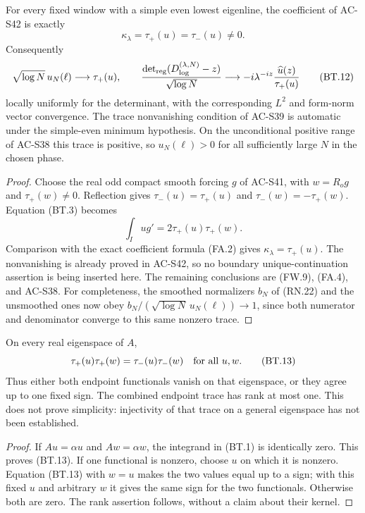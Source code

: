 \begin{theorem}
\label{AC-S43}
For every fixed window with a simple even lowest eigenline,
the coefficient of AC-S42 is exactly
\[
                      \kappa_\lambda=\tau_+(u)=\tau_-(u)
                                      \ne0.              \tag{BT.11}
\]
Consequently
\[
 \sqrt{\log N}\,u_N(\ell)\longrightarrow\tau_+(u),
 \qquad
 \frac{\det_{\rm reg}(D^{(\lambda,N)}_{\log}-z)}
                           {\sqrt{\log N}}
       \longrightarrow-i\lambda^{-iz}
                              \frac{\widehat u(z)}{\tau_+(u)}
                                                        \tag{BT.12}
\]
locally uniformly for the determinant, with the corresponding
\(L^2\) and form-norm vector convergence.
The trace nonvanishing condition of AC-S39 is automatic under
the simple-even minimum hypothesis.
On the unconditional positive range of AC-S38 this trace is
positive, so \(u_N(\ell)>0\) for all sufficiently large \(N\)
in the chosen phase.
\end{theorem}
\begin{proof}
Choose the real odd compact smooth forcing \(g\) of AC-S41,
with \(w=R_og\) and \(\tau_+(w)\ne0\).
Reflection gives
\(\tau_-(u)=\tau_+(u)\) and
\(\tau_-(w)=-\tau_+(w)\).
Equation (BT.3) becomes
\[
                    \int_Iu g'
                         =2\tau_+(u)\tau_+(w).
\]
Comparison with the exact coefficient formula (FA.2) gives
\(\kappa_\lambda=\tau_+(u)\).
The nonvanishing is already proved in AC-S42, so no boundary
unique-continuation assertion is being inserted here.
The remaining conclusions are (FW.9), (FA.4), and AC-S38.
For completeness, the smoothed normalizers \(b_N\) of (RN.22)
and the unsmoothed ones now obey
\(b_N/(\sqrt{\log N}\,u_N(\ell))\to1\), since both numerator
and denominator converge to this same nonzero trace.
\end{proof}

\begin{corollary}
\label{AC-S43-trace-rank}
On every real eigenspace of \(A\),
\[
                \tau_+(u)\tau_+(w)=\tau_-(u)\tau_-(w)
                             \quad\hbox{for all }u,w.    \tag{BT.13}
\]
Thus either both endpoint functionals vanish on that eigenspace,
or they agree up to one fixed sign.  The combined endpoint trace
has rank at most one.  This does not prove simplicity: injectivity
of that trace on a general eigenspace has not been established.
\end{corollary}
\begin{proof}
If \(Au=\alpha u\) and \(Aw=\alpha w\), the integrand in
(BT.1) is identically zero.  This proves (BT.13).
If one functional is nonzero, choose \(u\) on which it is nonzero.
Equation (BT.13) with \(w=u\) makes the two values equal up to
a sign; with this fixed \(u\) and arbitrary \(w\) it gives
the same sign for the two functionals.  Otherwise both are zero.
The rank assertion follows, without a claim about their kernel.
\end{proof}
